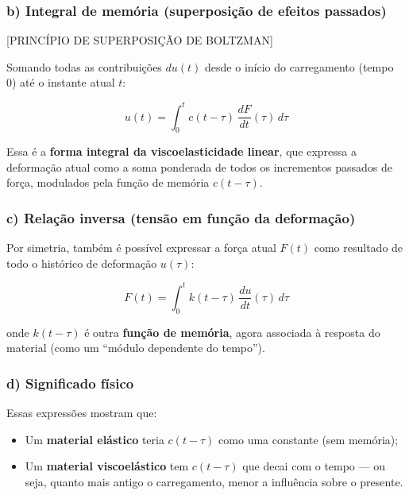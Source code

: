\subsubsection*{b) Integral de memória (superposição de efeitos passados)}

[PRINCÍPIO DE SUPERPOSIÇÃO DE BOLTZMAN]

Somando todas as contribuições $du(t)$ desde o início do carregamento (tempo 0) até o instante atual $t$:

\begin{equation}
    u(t) = \int_{0}^{t} c(t - \tau)\,\frac{dF}{dt}(\tau)\,d\tau
\end{equation}

Essa é a \textbf{forma integral da viscoelasticidade linear}, que expressa a deformação atual como a soma ponderada de todos os incrementos passados de força, modulados pela função de memória $c(t - \tau)$.



\subsubsection*{c) Relação inversa (tensão em função da deformação)}

Por simetria, também é possível expressar a força atual $F(t)$ como resultado de todo o histórico de deformação $u(\tau)$:

\begin{equation}
    F(t) = \int_{0}^{t} k(t - \tau)\,\frac{du}{dt}(\tau)\,d\tau
\end{equation}

onde $k(t - \tau)$ é outra \textbf{função de memória}, agora associada à resposta do material (como um ``módulo dependente do tempo'').


\subsubsection*{d) Significado físico}

Essas expressões mostram que:
\begin{itemize}
    \item Um \textbf{material elástico} teria $c(t - \tau)$ como uma constante (sem memória);
    \item Um \textbf{material viscoelástico} tem $c(t - \tau)$ que decai com o tempo --- ou seja, quanto mais antigo o carregamento, menor a influência sobre o presente.
\end{itemize}

